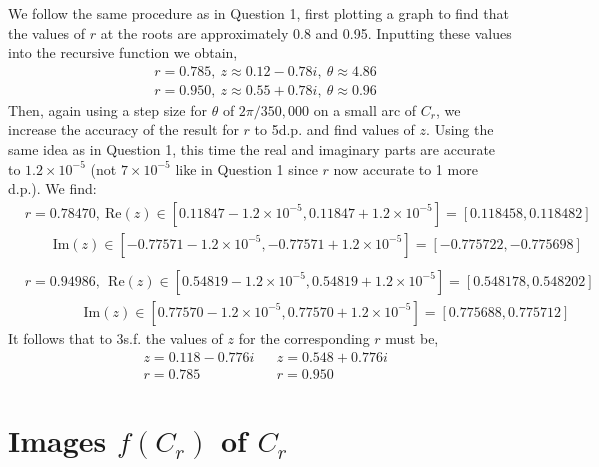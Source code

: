 \documentclass[12pt, a4paper]{article}
\begin{document}
We follow the same procedure as in Question 1, first plotting a graph to find that the values of $r$ at the roots are approximately 0.8 and 0.95. Inputting these values into the recursive function we obtain,
\begin{align}
	&r = 0.785, ~ z \approx 0.12-0.78i, ~ \theta\approx4.86\nonumber\\ %
	&r = 0.950, ~ z \approx 0.55+0.78i, ~ \theta\approx0.96\nonumber %
\end{align}
Then, again using a step size for $\theta$ of $2\pi/350,000$ on a small arc of $C_{r}$, we increase the accuracy of the result for $r$ to 5d.p. and find values of $z$. Using the same idea as in Question 1, this time the real and imaginary parts are accurate to $1.2\times10^{-5}$ (not $7\times10^{-5}$ like in Question 1 since $r$ now accurate to 1 more d.p.). We find:
\begin{align*}  %
	& r = 0.78470, ~ \text{Re}(z) \in [0.11847 - 1.2\times10^{-5}, 0.11847 + 1.2\times10^{-5}] = [0.118458, 0.118482] \\
	& ~~~~~~~~~ \text{Im}(z) \in [-0.77571 - 1.2\times10^{-5}, -0.77571 + 1.2\times10^{-5}] = [-0.775722, -0.775698] \\
	\\
	& r = 0.94986, ~ ~ \text{Re}(z) \in [0.54819 - 1.2\times10^{-5}, 0.54819 + 1.2\times10^{-5}] = [0.548178, 0.548202] \\
	& ~~~~~~~~~~~~~~~~~~~ \text{Im}(z) \in [0.77570 - 1.2\times10^{-5}, 0.77570 + 1.2\times10^{-5}] = [0.775688, 0.775712]
\end{align*}
It follows that to 3s.f. the values of $z$ for the corresponding $r$ must be,
\begin{align}
	& z = 0.118 - 0.776i && z = 0.548 + 0.776i \nonumber\\
	& r = 0.785 && r = 0.950 \nonumber 
\end{align}

\section{Images $f(C_{r})$ of $C_{r}$}
\end{document}
